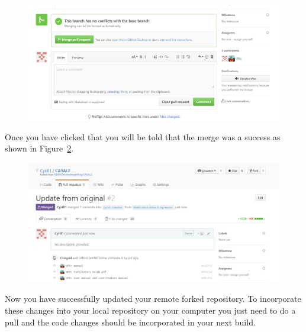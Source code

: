 \begin{figure}[!ht]
	\includegraphics[scale=0.6]{Figures/Compare_fork6.png}
	\caption{}\label{fig:fork_compare4}
\end{figure}
\clearpage
Once you have clicked that you will be told that the merge was a success as shown in Figure~\ref{fig:fork_compare5}.
\begin{figure}[!ht]
	\includegraphics[scale=0.6]{Figures/Compare_fork7.png}
	\caption{}\label{fig:fork_compare5}
\end{figure}

Now you have successfully updated your remote forked repository. To incorporate these changes into your local repository on your computer you just need to do a pull and the code changes should be incorporated in your next build.
